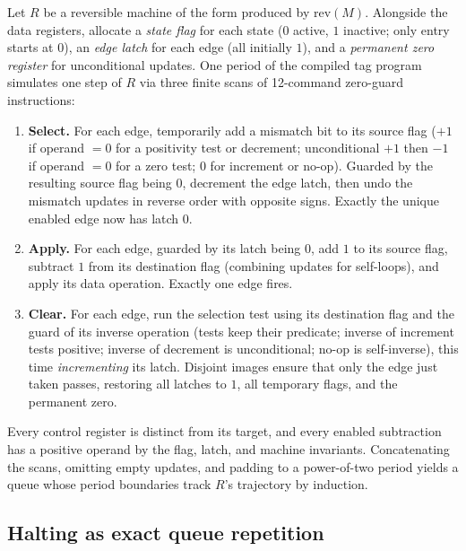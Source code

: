 \documentclass{article}
\theoremstyle{definition}
\theoremstyle{remark}
\begin{document}
Let $R$ be a reversible machine of the form produced by $\mathrm{rev}(M)$.
Alongside the data registers, allocate a \emph{state flag} for each state ($0$ active, $1$ inactive; only entry starts at $0$), an \emph{edge latch} for each edge (all initially $1$), and a \emph{permanent zero register} for unconditional updates.
One period of the compiled tag program simulates one step of $R$ via three finite scans of 12-command zero-guard instructions:
\begin{enumerate}
\item \textbf{Select.} For each edge, temporarily add a mismatch bit to its source flag ($+1$ if operand $=0$ for a positivity test or decrement; unconditional $+1$ then $-1$ if operand $=0$ for a zero test; $0$ for increment or no-op). Guarded by the resulting source flag being $0$, decrement the edge latch, then undo the mismatch updates in reverse order with opposite signs. Exactly the unique enabled edge now has latch $0$.
\item \textbf{Apply.} For each edge, guarded by its latch being $0$, add $1$ to its source flag, subtract $1$ from its destination flag (combining updates for self-loops), and apply its data operation. Exactly one edge fires.
\item \textbf{Clear.} For each edge, run the selection test using its destination flag and the guard of its inverse operation (tests keep their predicate; inverse of increment tests positive; inverse of decrement is unconditional; no-op is self-inverse), this time \emph{incrementing} its latch. Disjoint images ensure that only the edge just taken passes, restoring all latches to $1$, all temporary flags, and the permanent zero.
\end{enumerate}
Every control register is distinct from its target, and every enabled subtraction has a positive operand by the flag, latch, and machine invariants.
Concatenating the scans, omitting empty updates, and padding to a power-of-two period yields a queue whose period boundaries track $R$'s trajectory by induction.

\subsection{Halting as exact queue repetition}
\end{document}
